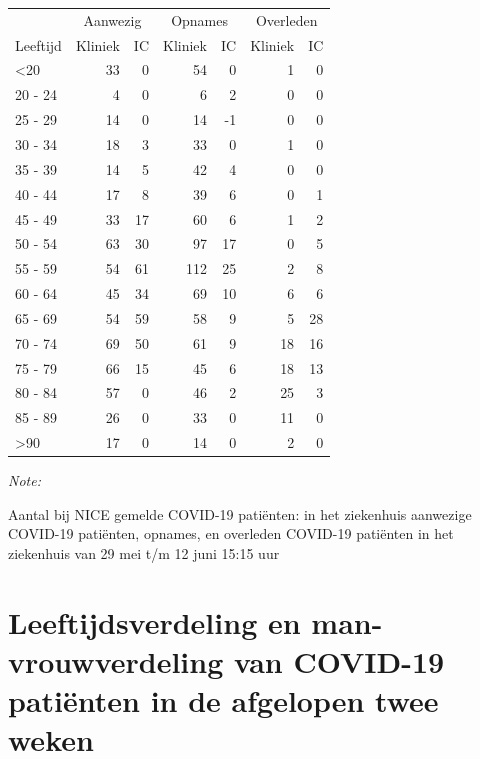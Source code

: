 \documentclass[
  english,
  man,floatsintext]{apa6}
\begin{document}
\begin{table}
\centering\begingroup\fontsize{10}{12}\selectfont

\begin{threeparttable}
\begin{tabular}{lrrrrrr}
\toprule
\multicolumn{1}{c}{ } & \multicolumn{2}{c}{Aanwezig} & \multicolumn{2}{c}{Opnames} & \multicolumn{2}{c}{Overleden} \\
\cmidrule(l{3pt}r{3pt}){2-3} \cmidrule(l{3pt}r{3pt}){4-5} \cmidrule(l{3pt}r{3pt}){6-7}
Leeftijd & Kliniek & IC & Kliniek & IC & Kliniek & IC\\
\midrule
<20 & 33 & 0 & 54 & 0 & 1 & 0\\
20 - 24 & 4 & 0 & 6 & 2 & 0 & 0\\
25 - 29 & 14 & 0 & 14 & -1 & 0 & 0\\
30 - 34 & 18 & 3 & 33 & 0 & 1 & 0\\
35 - 39 & 14 & 5 & 42 & 4 & 0 & 0\\
40 - 44 & 17 & 8 & 39 & 6 & 0 & 1\\
45 - 49 & 33 & 17 & 60 & 6 & 1 & 2\\
50 - 54 & 63 & 30 & 97 & 17 & 0 & 5\\
55 - 59 & 54 & 61 & 112 & 25 & 2 & 8\\
60 - 64 & 45 & 34 & 69 & 10 & 6 & 6\\
65 - 69 & 54 & 59 & 58 & 9 & 5 & 28\\
70 - 74 & 69 & 50 & 61 & 9 & 18 & 16\\
75 - 79 & 66 & 15 & 45 & 6 & 18 & 13\\
80 - 84 & 57 & 0 & 46 & 2 & 25 & 3\\
85 - 89 & 26 & 0 & 33 & 0 & 11 & 0\\
>90 & 17 & 0 & 14 & 0 & 2 & 0\\
\bottomrule
\end{tabular}
\begin{tablenotes}
\item \textit{Note: } 
\item Aantal bij NICE gemelde COVID-19 patiënten: in het ziekenhuis aanwezige COVID-19 patiënten, opnames, en overleden COVID-19 patiënten in het ziekenhuis van 29 mei t/m 12 juni 15:15 uur
\end{tablenotes}
\end{threeparttable}
\endgroup{}
\end{table}

\newpage

\hypertarget{leeftijdsverdeling-en-man-vrouwverdeling-van-covid-19-patiuxebnten-in-de-afgelopen-twee-weken}{%
\section{Leeftijdsverdeling en man-vrouwverdeling van COVID-19 patiënten in de afgelopen twee weken}\label{leeftijdsverdeling-en-man-vrouwverdeling-van-covid-19-patiuxebnten-in-de-afgelopen-twee-weken}}
\end{document}

